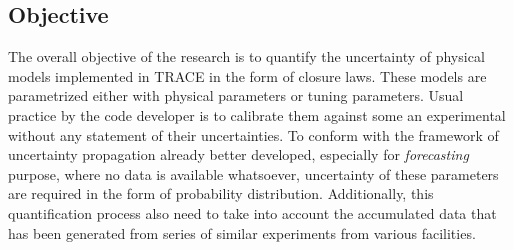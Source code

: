 \documentclass[11pt,titlepage]{article}
\begin{document}




\subsection{Objective}

The overall objective of the research is to quantify the uncertainty of physical models implemented in TRACE in the form of closure laws. 
These models are parametrized either with physical parameters or tuning parameters. 
Usual practice by the code developer is to calibrate them against some an experimental without any statement of their uncertainties. 
To conform with the framework of uncertainty propagation already better developed, especially for \emph{forecasting} purpose, where no data is available whatsoever, uncertainty of these parameters are required in the form of probability distribution. 
Additionally, this quantification process also need to take into account the accumulated data that has been generated from series of similar experiments from various facilities.
\end{document}
